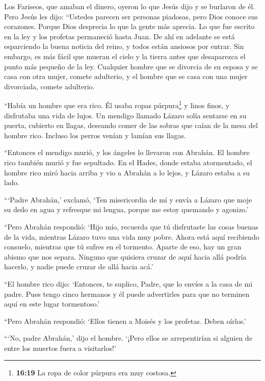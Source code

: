  Los Fariseos, que amaban el dinero, oyeron lo que Jesús
dijo y se burlaron de él.  Pero Jesús les dijo: ``Ustedes
parecen ser personas piadosas, pero Dios conoce sus corazones. Porque
Dios desprecia lo que la gente más aprecia.  Lo que fue
escrito en la ley y los profetas permaneció hasta Juan. De ahí en
adelante se está esparciendo la buena noticia del reino, y todos están
ansiosos por entrar.  Sin embargo, es más fácil que mueran
el cielo y la tierra antes que desaparezca el punto más pequeño de la
ley.  Cualquier hombre que se divorcia de su esposa y se
casa con otra mujer, comete adulterio, y el hombre que se casa con una
mujer divorciada, comete adulterio.

 ``Había un hombre que era rico. Él usaba ropas
púrpura\footnote{\textbf{16:19} La ropa de color púrpura era muy
  costosa.} y linos finos, y disfrutaba una vida de lujos. 
Un mendigo llamado Lázaro solía sentarse en su puerta, cubierto en
llagas,  deseando comer de las sobras que caían de la mesa
del hombre rico. Incluso los perros venían y lamían sus llagas.

 ``Entonces el mendigo murió, y los ángeles lo llevaron con
Abrahán. El hombre rico también murió y fue sepultado.  En
el Hades, donde estaba atormentado, el hombre rico miró hacia arriba y
vio a Abrahán a lo lejos, y Lázaro estaba a su lado.

 ```Padre Abrahán,' exclamó, `Ten misericordia de mí y
envía a Lázaro que moje su dedo en agua y refresque mi lengua, porque me
estoy quemando y agonizo.'

 ``Pero Abrahán respondió: `Hijo mío, recuerda que tú
disfrutaste las cosas buenas de la vida, mientras Lázaro tuvo una vida
muy pobre. Ahora está aquí recibiendo consuelo, mientras que tú sufres
en el tormento.  Aparte de eso, hay un gran abismo que nos
separa. Ninguno que quisiera cruzar de aquí hacia allá podría hacerlo, y
nadie puede cruzar de allá hacia acá.'

 ``El hombre rico dijo: `Entonces, te suplico, Padre, que
lo envíes a la casa de mi padre.  Pues tengo cinco hermanos
y él puede advertirles para que no terminen aquí en este lugar
tormentoso.'

 ``Pero Abrahán respondió: `Ellos tienen a Moisés y los
profetas. Deben oírlos.'

 ```No, padre Abrahán,' dijo el hombre. `¡Pero ellos se
arrepentirían si alguien de entre los muertos fuera a visitarlos!'

